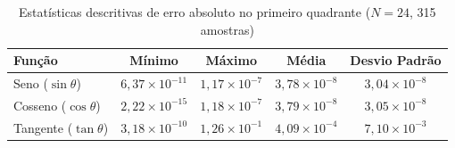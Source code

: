 \begin{table}[htbp]
\centering
\caption{Estatísticas descritivas de erro absoluto no primeiro quadrante ($N = 24$, 315 amostras)}
\label{tab:estatistica_24}
\begin{tabular}{lcccc}
\hline
Função & Mínimo & Máximo & Média & Desvio Padrão \\
\hline
Seno ($\sin\theta$) & $6,37 \times 10^{-11}$ & $1,17 \times 10^{-7}$ & $3,78 \times 10^{-8}$ & $3,04 \times 10^{-8}$ \\
Cosseno ($\cos\theta$) & $2,22 \times 10^{-15}$ & $1,18 \times 10^{-7}$ & $3,79 \times 10^{-8}$ & $3,05 \times 10^{-8}$ \\
Tangente ($\tan\theta$) & $3,18 \times 10^{-10}$ & $1,26 \times 10^{-1}$ & $4,09 \times 10^{-4}$ & $7,10 \times 10^{-3}$ \\
\hline
\end{tabular}
\end{table}